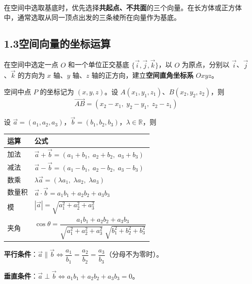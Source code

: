 \documentclass[12pt, a4paper]{ctexart}
\begin{document}
\begin{tipbox}[规律总结]
在空间中选取基底时，优先选择\textbf{共起点、不共面}的三个向量。在长方体或正方体中，通常选取从同一顶点出发的三条棱所在向量作为基底。
\end{tipbox}

\subsection*{1.3\quad 空间向量的坐标运算}

\begin{knowledgebox}[空间直角坐标系]
在空间中选定一点 $O$ 和一个单位正交基底 $\{\vec{i},\vec{j},\vec{k}\}$，以 $O$ 为原点，分别以 $\vec{i}$、$\vec{j}$、$\vec{k}$ 的方向为 $x$ 轴、$y$ 轴、$z$ 轴的正方向，建立\textbf{空间直角坐标系} $Oxyz$。

空间中点 $P$ 的坐标记为 $(x,y,z)$。设 $A(x_1,y_1,z_1)$、$B(x_2,y_2,z_2)$，则
\[
\overrightarrow{AB}=(x_2-x_1,\;y_2-y_1,\;z_2-z_1)
\]
\end{knowledgebox}

\begin{knowledgebox}[坐标运算法则]
设 $\vec{a}=(a_1,a_2,a_3)$，$\vec{b}=(b_1,b_2,b_3)$，$\lambda\in\mathbb{R}$，则

\begin{center}
\renewcommand{\arraystretch}{1.4}
\begin{tabular}{ll}
\toprule
运算 & 公式 \\
\midrule
加法 & $\vec{a}+\vec{b}=(a_1+b_1,\;a_2+b_2,\;a_3+b_3)$ \\
减法 & $\vec{a}-\vec{b}=(a_1-b_1,\;a_2-b_2,\;a_3-b_3)$ \\
数乘 & $\lambda\vec{a}=(\lambda a_1,\;\lambda a_2,\;\lambda a_3)$ \\
数量积 & $\vec{a}\cdot\vec{b}=a_1b_1+a_2b_2+a_3b_3$ \\
模 & $|\vec{a}|=\sqrt{a_1^2+a_2^2+a_3^2}$ \\
夹角 & $\cos\theta=\dfrac{a_1b_1+a_2b_2+a_3b_3}{\sqrt{a_1^2+a_2^2+a_3^2}\;\sqrt{b_1^2+b_2^2+b_3^2}}$ \\
\bottomrule
\end{tabular}
\end{center}

\textbf{平行条件}：$\vec{a}\parallel\vec{b}\iff\dfrac{a_1}{b_1}=\dfrac{a_2}{b_2}=\dfrac{a_3}{b_3}$（分母不为零时）。

\textbf{垂直条件}：$\vec{a}\perp\vec{b}\iff a_1b_1+a_2b_2+a_3b_3=0$。
\end{knowledgebox}
\end{document}
